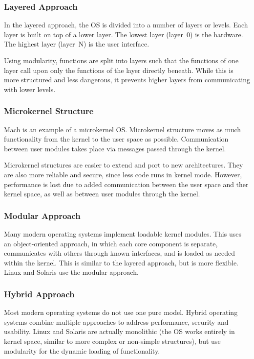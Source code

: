 \subsubsection{Layered Approach}

In the layered approach, the OS is divided into a number of layers or levels.
Each layer is built on top of a lower layer.
The lowest layer (layer~0) is the hardware.
The highest layer (layer~N) is the user interface.

Using modularity, functions are split into layers such that the functions of one layer call upon only the functions of the layer directly beneath.
While this is more structured and less dangerous, it prevents higher layers from communicating with lower levels.

\subsubsection{Microkernel Structure}

Mach is an example of a microkernel OS.
Microkernel structure moves as much functionality from the kernel to the user space as possible.
Communication between user modules takes place via messages passed through the kernel.

Microkernel structures are easier to extend and port to new architectures.
They are also more reliable and secure, since less code runs in kernel mode.
However, performance is lost due to added communication between the user space and ther kernel space, as well as between user modules through the kernel.

\subsubsection{Modular Approach}

Many modern operating systems implement loadable kernel modules.
This uses an object-oriented approach, in which each core component is separate, communicates with others through known interfaces, and is loaded as needed within the kernel.
This is similar to the layered approach, but is more flexible.
Linux and Solaris use the modular approach.

\subsubsection{Hybrid Approach}

Most modern operating systems do not use one pure model.
Hybrid operating systems combine multiple approaches to address performance, security and usability.
Linux and Solaris are actually monolithic (the OS works entirely in kernel space, similar to more complex or non-simple structures), but use modularity for the dynamic loading of functionality.

